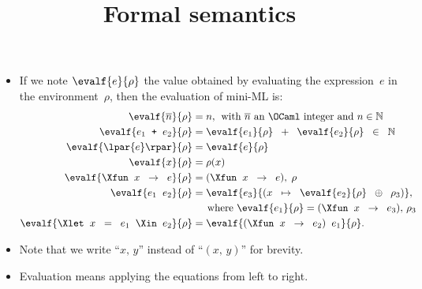 \documentclass[wide]{slides}
\begin{document}
\begin{slide}
  \title{Formal semantics}

  \begin{itemize}

    \item If we note \(\evalf{e}{\rho}\) the value obtained by
      evaluating the expression~\(e\) in the environment~\(\rho\),
      then the evaluation of mini-ML is:
      \begin{align*}
        \evalf{\overline{n}}{\rho} &= n, \;\, \text{with
          $\overline{n}$ an \OCaml integer and $n \in \mathbb{N}$}\\
        \evalf{e_1 \;\; \texttt{+} \;\; e_2}{\rho} &=
        \evalf{e_1}{\rho} \;\; + \;\;
        \evalf{e_2}{\rho} \;\; \in \;\; \mathbb{N}\\
        \evalf{\lpar{e}\rpar}{\rho} &= \evalf{e}{\rho}\\
        \evalf{x}{\rho} &= \rho(x)\\
        \evalf{\Xfun \;\; x \;\; \rightarrow \;\; e}{\rho} &= (\Xfun
        \;\; x \;\; \rightarrow \;\; e), \; \rho\\
        \evalf{e_1 \;\; e_2}{\rho} &= \evalf{e_3}{(x \;\; \mapsto \;\;
          \evalf{e_2}{\rho} \;\; \oplus \;\; \rho_3)},\\
        &\phantom{=\llbracket} \textnormal{where} \ \evalf{e_1}{\rho} =
        (\Xfun \;\; x \;\; \rightarrow \;\; e_3), \, \rho_3\\
        \evalf{\Xlet \;\; x \;\; = \;\; e_1 \;\; \Xin \;\; e_2}{\rho}
        &= \evalf{(\Xfun \;\; x \;\; \rightarrow \;\; e_2) \;\;
          e_1}{\rho}.
      \end{align*}

    \item Note that we write ``$x,\, y$'' instead of ``$(x,\, y)$''
      for brevity.

    \item Evaluation means applying the equations from left to right.

  \end{itemize}

\end{slide}
\end{document}
